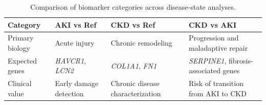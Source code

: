 \begin{table}[H]
\centering
\caption{Comparison of biomarker categories across disease-state analyses.}
\label{tab:biomarker_comparison}
\begin{tabularx}{\textwidth}{lXXX}
\toprule
Category & AKI vs Ref & CKD vs Ref & CKD vs AKI \\
\midrule
Primary biology & Acute injury & Chronic remodeling & Progression and maladaptive repair \\
Expected genes & \textit{HAVCR1}, \textit{LCN2} & \textit{COL1A1}, \textit{FN1} & \textit{SERPINE1}, fibrosis-associated genes \\
Clinical value & Early damage detection & Chronic disease characterization & Risk of transition from AKI to CKD \\
\bottomrule
\end{tabularx}
\end{table}
